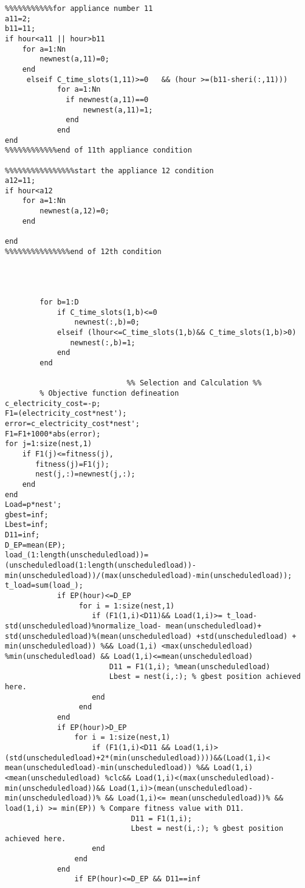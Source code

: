 \begin{linenumbers}
\begin{lstlisting}
%%%%%%%%%%%for appliance number 11
a11=2;
b11=11;
if hour<a11 || hour>b11
    for a=1:Nn
        newnest(a,11)=0;
    end
     elseif C_time_slots(1,11)>=0	&& (hour >=(b11-sheri(:,11)))
            for a=1:Nn
              if newnest(a,11)==0
                  newnest(a,11)=1;
              end
            end
end
%%%%%%%%%%%%end of 11th appliance condition

%%%%%%%%%%%%%%%%start the appliance 12 condition
a12=11;
if hour<a12
    for a=1:Nn
        newnest(a,12)=0;
    end

end
%%%%%%%%%%%%%%%end of 12th condition




        for b=1:D		
            if C_time_slots(1,b)<=0		
                newnest(:,b)=0;		
            elseif (lhour<=C_time_slots(1,b)&& C_time_slots(1,b)>0)		
               newnest(:,b)=1;		
            end		
        end				
       		
                            %% Selection and Calculation %%	
		% Objective function defineation
c_electricity_cost=-p;
F1=(electricity_cost*nest');						
error=c_electricity_cost*nest';		
F1=F1+1000*abs(error);
for j=1:size(nest,1)
    if F1(j)<=fitness(j),
       fitness(j)=F1(j);
       nest(j,:)=newnest(j,:);
    end
end
Load=p*nest';		
gbest=inf;		
Lbest=inf;
D11=inf;
D_EP=mean(EP);
load_(1:length(unscheduledload))=(unscheduledload(1:length(unscheduledload))-min(unscheduledload))/(max(unscheduledload)-min(unscheduledload));
t_load=sum(load_);
            if EP(hour)<=D_EP		
                 for i = 1:size(nest,1)		
                    if (F1(1,i)<D11)&& Load(1,i)>= t_load-std(unscheduledload)%normalize_load- mean(unscheduledload)+ std(unscheduledload)%(mean(unscheduledload) +std(unscheduledload) + min(unscheduledload)) %&& Load(1,i) <max(unscheduledload) %min(unscheduledload) && Load(1,i)<=mean(unscheduledload)		
                        D11 = F1(1,i); %mean(unscheduledload)		
                        Lbest = nest(i,:); % gbest position achieved here.    		
                    end		
                 end		
            end		
            if EP(hour)>D_EP		
                for i = 1:size(nest,1)		
                    if (F1(1,i)<D11 && Load(1,i)> (std(unscheduledload)+2*(min(unscheduledload))))&&(Load(1,i)< mean(unscheduledload)-min(unscheduledload)) %&& Load(1,i)<mean(unscheduledload) %clc&& Load(1,i)<(max(unscheduledload)-min(unscheduledload))&& Load(1,i)>(mean(unscheduledload)-min(unscheduledload))% && Load(1,i)<= mean(unscheduledload))% && load(1,i) >= min(EP)) % Compare fitness value with D11.		
                             D11 = F1(1,i);		
                             Lbest = nest(i,:); % gbest position achieved here.    	
                    end		
                end		
            end
                if EP(hour)<=D_EP && D11==inf


\end{lstlisting}
\end{linenumbers}
